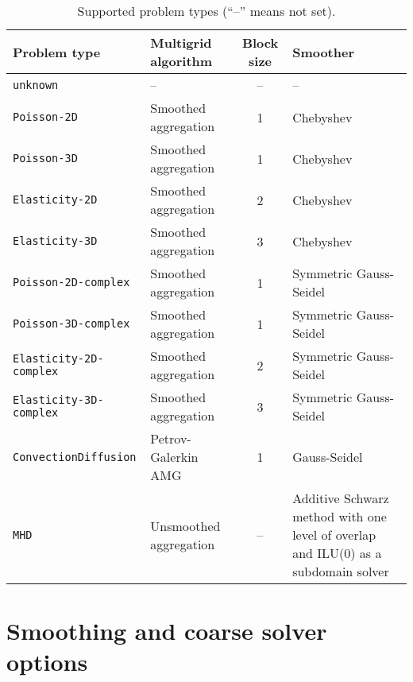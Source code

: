 \begin{table}[h!]
  \begin{center}
    \begin{tabular}{p{4.3cm} p{4.3cm} c p{4.5cm}}
      \toprule
      Problem type                 & Multigrid algorithm    & Block size  & Smoother \\
      \midrule
      \verb!unknown!               & --                     & --          & -- \\
      \verb!Poisson-2D!            & Smoothed aggregation   & 1           & Chebyshev \\
      \verb!Poisson-3D!            & Smoothed aggregation   & 1           & Chebyshev \\
      \verb!Elasticity-2D!         & Smoothed aggregation   & 2           & Chebyshev \\
      \verb!Elasticity-3D!         & Smoothed aggregation   & 3           & Chebyshev \\
      \verb!Poisson-2D-complex!    & Smoothed aggregation   & 1           & Symmetric Gauss-Seidel \\
      \verb!Poisson-3D-complex!    & Smoothed aggregation   & 1           & Symmetric Gauss-Seidel \\
      \verb!Elasticity-2D-complex! & Smoothed aggregation   & 2           & Symmetric Gauss-Seidel \\
      \verb!Elasticity-3D-complex! & Smoothed aggregation   & 3           & Symmetric Gauss-Seidel \\
      \verb!ConvectionDiffusion!   & Petrov-Galerkin  AMG   & 1           & Gauss-Seidel \\
      \verb!MHD!                   & Unsmoothed aggregation & --          & Additive Schwarz method with one level of overlap and ILU(0) as a subdomain solver \\
      \bottomrule
    \end{tabular}
    \caption{Supported problem types (``--'' means not set).}
\label{t:problem_types}
  \end{center}
\end{table}



\section{Smoothing and coarse solver options}
\label{sec:options_smoothing}

